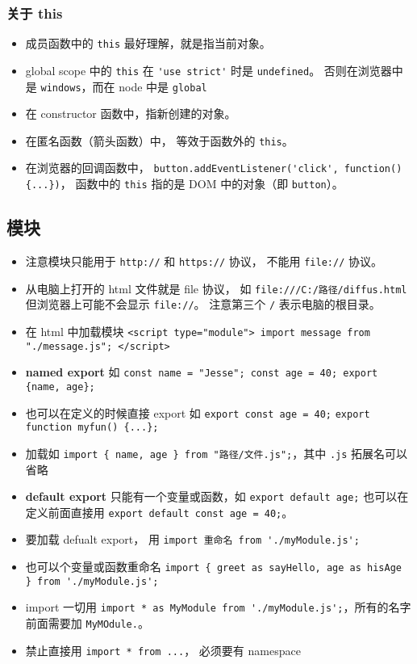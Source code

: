 \subsubsection{关于 this}
\begin{itemize}
\item 成员函数中的 \verb`this` 最好理解，就是指当前对象。
\item global scope 中的 \verb`this` 在 \verb`'use strict'` 时是 \verb`undefined`。 否则在浏览器中是 \verb`windows`，而在 node 中是 \verb`global`
\item 在 constructor 函数中，指新创建的对象。
\item 在匿名函数（箭头函数）中， 等效于函数外的 \verb`this`。
\item 在浏览器的回调函数中， \verb`button.addEventListener('click', function() {...})`， 函数中的 \verb`this` 指的是 DOM 中的对象（即 \verb`button`）。
\end{itemize}

\subsection{模块}
\begin{itemize}
\item 注意模块只能用于 \verb`http://` 和 \verb`https://` 协议， 不能用 \verb`file://` 协议。
\item 从电脑上打开的 html 文件就是 file 协议， 如 \verb`file:///C:/路径/diffus.html` 但浏览器上可能不会显示 \verb`file://`。 注意第三个 \verb`/` 表示电脑的根目录。
\item 在 html 中加载模块 \verb`<script type="module"> import message from "./message.js"; </script>`
\item \textbf{named export} 如 \verb`const name = "Jesse"; const age = 40; export {name, age};`
\item 也可以在定义的时候直接 export 如 \verb`export const age = 40;` \verb`export function myfun() {...};`
\item 加载如 \verb`import { name, age } from "路径/文件.js";`，其中 \verb`.js` 拓展名可以省略
\item \textbf{default export} 只能有一个变量或函数，如 \verb`export default age;` 也可以在定义前面直接用 \verb`export default const age = 40;`。
\item 要加载 defualt export， 用 \verb`import 重命名 from './myModule.js';`
\item 也可以个变量或函数重命名 \verb`import { greet as sayHello, age as hisAge } from './myModule.js';`
\item import 一切用 \verb`import * as MyModule from './myModule.js';`，所有的名字前面需要加 \verb`MyMOdule.`。
\item 禁止直接用 \verb`import * from ...`， 必须要有 namespace
\end{itemize}

